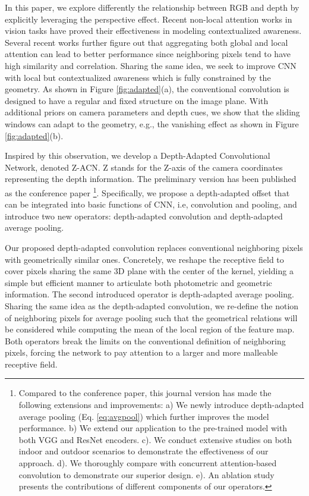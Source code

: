 \documentclass[lettersize,journal]{IEEEtran}
\begin{document}
In this paper, we explore differently the relationship between RGB and depth by explicitly leveraging the perspective effect. Recent non-local attention \cite{dai2017deformable,wang2018non,vaswani2017attention,woo2018cbam,hu2018senet,liu2021Swin} works in vision tasks have proved their effectiveness in modeling contextualized awareness. Several recent works \cite{chu2021conditional,pan2021integration,liu2022convnet} further figure out that aggregating both global and local attention can lead to better performance since neighboring pixels tend to have high similarity and correlation. Sharing the same idea, we seek to improve CNN with local but contextualized awareness which is fully constrained by the geometry. As shown in Figure \ref{fig:adapted}(a), the conventional convolution is designed to have a regular and fixed structure on the image plane. With additional priors on camera parameters and depth cues, we show that the sliding windows can adapt to the geometry, e.g., the vanishing effect as shown in Figure \ref{fig:adapted}(b). 




Inspired by this observation, we develop a Depth-Adapted Convolutional Network, denoted Z-ACN. Z stands for the Z-axis of the camera coordinates representing the depth information. The preliminary version has been published as the conference paper \cite{wu2020depth} \footnote{Compared to the conference paper, this journal version has made the following extensions and improvements: a) We newly introduce depth-adapted average pooling (Eq. \ref{eq:avgpool}) which further improves the model performance. b) We extend our application to the pre-trained model with both VGG and ResNet encoders. c). We conduct extensive studies on both indoor and outdoor scenarios to demonstrate the effectiveness of our approach. d). We thoroughly compare with concurrent attention-based convolution to demonstrate our superior design. e). An ablation study presents the contributions of different components of our operators.}. Specifically, we propose a depth-adapted offset that can be integrated into basic functions of CNN, i.e, convolution and pooling, and introduce two new operators: depth-adapted convolution and depth-adapted average pooling. 


Our proposed depth-adapted convolution replaces conventional neighboring pixels with geometrically similar ones. Concretely, we reshape the receptive field to cover pixels sharing the same 3D plane with the center of the kernel, yielding a simple but efficient manner to articulate both photometric and geometric information. The second introduced operator is depth-adapted average pooling. Sharing the same idea as the depth-adapted convolution, we re-define the notion of neighboring pixels for average pooling such that the geometrical relations will be considered while computing the mean of the local region of the feature map. Both operators break the limits on the conventional definition of neighboring pixels, forcing the network to pay attention to a larger and more malleable receptive field.
\end{document}
